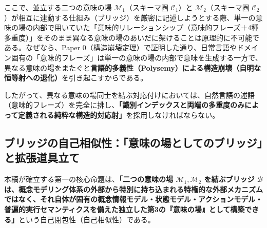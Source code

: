 \documentclass[11pt,a4paper]{ltjsarticle}
\theoremstyle{definition}
\theoremstyle{plain}
\theoremstyle{remark}
\begin{document}
ここで、並立する二つの意味の場 $\mathcal{M}_1$（スキーマ圏 $\mathcal{C}_1$）と $\mathcal{M}_2$（スキーマ圏 $\mathcal{C}_2$）が相互に連動する仕組み（ブリッジ）を厳密に記述しようとする際、単一の意味の場の内部で用いていた「意味的リレーションシップ（意味的フレーズ＋4種多重度）」をそのまま異なる意味の場のあいだに架けることは原理的に不可能である。なぜなら、Paper 0（構造崩壊定理）で証明した通り、日常言語やドメイン固有の「意味的フレーズ」は単一の意味の場の内部で意味を生成する一方で、異なる意味の場をまたぐと\textbf{言語的多義性（Polysemy）による構造崩壊（自明な恒等射への退化）}を引き起こすからである。

したがって、異なる意味の場同士を結ぶ対応付けにおいては、自然言語の述語（意味的フレーズ）を完全に排し、\textbf{「識別インデックスと両端の多重度のみによって定義される純粋な構造的対応射」}を採用しなければならない。

\subsection{ブリッジの自己相似性：「意味の場としてのブリッジ」と拡張道具立て}
本稿が確立する第一の核心命題は、\textbf{「二つの意味の場 $\mathcal{M}_1, \mathcal{M}_2$ を結ぶブリッジ $\mathcal{B}$ は、概念モデリング体系の外部から特別に持ち込まれる特権的な外部メカニズムではなく、それ自体が固有の概念情報モデル・状態モデル・アクションモデル・普遍的実行セマンティクスを備えた独立した第3の『意味の場』として構築できる」}という自己閉包性（自己相似性）である。
\end{document}
